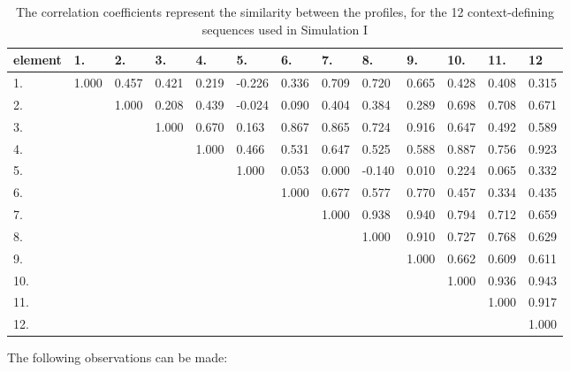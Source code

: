 \begin{table}[!h]
\footnotesize
\begin{tabular}{l|llllllllllll}
element&1.&2.&3.&4.&5.&6.&7.&8.&9.&10.&11.&12 \\ \hline 1.
&1.000&0.457&0.421&0.219&-0.226&0.336&0.709&0.720&0.665&0.428&0.408&0.315\\
2.
&&1.000&0.208&0.439&-0.024&0.090&0.404&0.384&0.289&0.698&0.708&0.671\\
3.
&&&1.000&0.670&0.163&0.867&0.865&0.724&0.916&0.647&0.492&0.589\\
4. &&&&1.000&0.466&0.531&0.647&0.525&0.588&0.887&0.756&0.923\\ 5.
&&&&&1.000&0.053&0.000&-0.140&0.010&0.224&0.065&0.332\\ 6.
&&&&&&1.000&0.677&0.577&0.770&0.457&0.334&0.435\\ 7.
&&&&&&&1.000&0.938&0.940&0.794&0.712&0.659\\ 8.
&&&&&&&&1.000&0.910&0.727&0.768&0.629\\ 9.
&&&&&&&&&1.000&0.662&0.609&0.611\\ 10.
&&&&&&&&&&1.000&0.936&0.943\\ 11. &&&&&&&&&&&1.000&0.917\\ 12.
&&&&&&&&&&&&1.000\\
\end{tabular}
\caption{The correlation coefficients represent the similarity
between the profiles, for the 12 context-defining sequences used
in Simulation I}
\label{table_two}
\end{table}
%
The following observations can be made:
